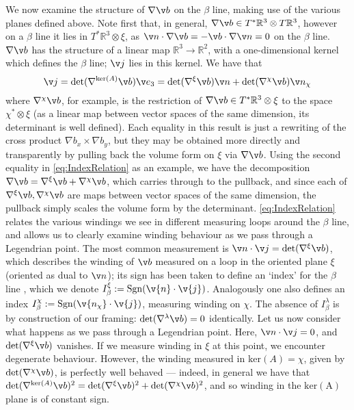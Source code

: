 We now examine the structure of $\nabla \v b$ on the $\beta$ line, making use of the various planes defined above. Note first that, in general, $\nabla \v b \in T^*\mathbb{R}^3 \otimes T\mathbb{R}^3$, however on a $\beta$ line it lies in $T^*\mathbb{R}^3 \otimes \xi$, as $\v n \cdot \nabla \v b = - \v b \cdot \nabla \v n = 0$ on the $\beta$ line.  $\nabla \v b$ has the structure of a linear map $\mathbb{R}^3 \rightarrow \mathbb{R}^2$, with a one-dimensional kernel  which defines the $\beta$ line; $\v j$ lies in this kernel. We have that 
\begin{equation}
\v j = \mathrm{det}(\nabla^{\ker(A)}\v b) \v e_3 = \mathrm{det}(\nabla^\xi \v b) \v n + \mathrm{det}(\nabla^\chi \v b) \v n_\chi
\label{eq:IndexRelation}
\end{equation}
where $\nabla^\chi \v b$, for example, is the restriction of $\nabla \v b \in T^*\mathbb{R}^3 \otimes \xi $ to the space $\chi^* \otimes \xi$ (as a linear map between vector spaces of the same dimension, its determinant is well defined). Each equality in this result is just a rewriting of the cross product $\nabla b_x \times \nabla b_y$, but they may be obtained more directly and transparently by pulling back the volume form on $\xi$ via $\nabla \v b$. Using the second equality  in \eqref{eq:IndexRelation} as an example, we have the decomposition $\nabla \v b = \nabla^\xi \v b + \nabla^\chi \v b $, which carries through to the pullback, and since each of $\nabla^\xi \v b, \nabla^\chi \v b$ are maps between vector spaces of the same dimension, the pullback simply scales the volume form by the determinant. \eqref{eq:IndexRelation} relates the various windings we see in different measuring loops around the $\beta$ line, and allows us to clearly examine winding behaviour as we pass through a Legendrian point. The most common measurement \citep{Nye1987,Berry1998,Berry2004} is $\v n \cdot \v j = \mathrm{det}(\nabla^\xi \v b)$, which describes the winding of $\v b$ measured on a loop in the oriented plane $\xi$ (oriented as dual to $\v n$); its sign has been taken to define an `index' for the $\beta$ line \citep{Nye1987,Berry1998,Berry2004}, which we denote $I^\xi_{\beta} :=  \mathrm{Sgn}(\v{n} \cdot \v{j})$. Analogously one also defines an index $I^\chi_\beta := \mathrm{Sgn}(\v{n_\chi} \cdot \v{j})$, measuring winding on $\chi$. The absence of $I^\lambda_\beta$ is by construction of our framing: $\mathrm{det}(\nabla^\lambda \v b) =0$ identically. Let us now consider what happens as we pass through a Legendrian point. Here, $\v n \cdot \v j =0$, and $\det(\nabla^\xi \v b)$ vanishes. If we measure winding in $\xi$ at this point, we encounter degenerate behaviour. However, the winding measured in $\mathrm{ker}(A) = \chi$, given by $\mathrm{det}(\nabla^\chi \v b)$, is perfectly well behaved --- indeed, in general we have that $\mathrm{det}(\nabla^{\ker(A)}\v b)^2 = \mathrm{det}(\nabla^\xi \v b)^2+ \mathrm{det}(\nabla^\chi \v b)^2$, and so winding in the $\mathrm{ker(A)}$ plane is of constant sign.

